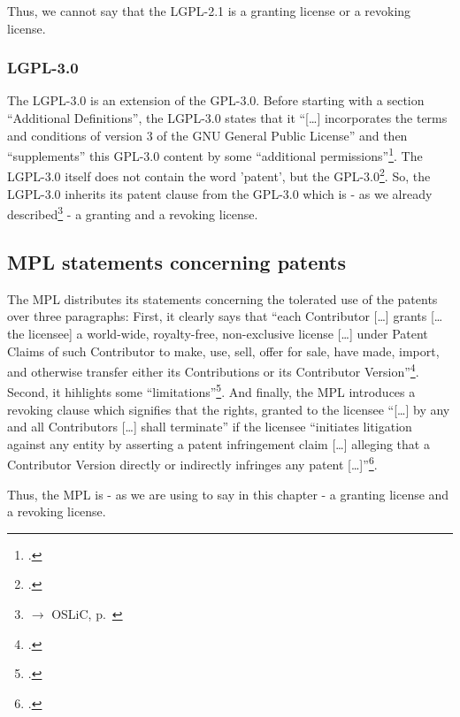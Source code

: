 Thus, we cannot say that the LGPL-2.1 is a granting license or a revoking
license.

\subsubsection {LGPL-3.0}\label{subsec:Lgpl30PatentClause}

The LGPL-3.0 is an extension of the GPL-3.0. Before starting with a section
\enquote{Additional Definitions}, the LGPL-3.0 states that it \enquote{[\ldots]
incorporates the terms and conditions of version 3 of the GNU General Public
License} and then \enquote{supplements} this GPL-3.0 content by some
\enquote{additional permissions}\footcite[cf.][\nopage
wp.]{Lgpl30OsiLicense2007a}. The LGPL-3.0 itself does not contain the word
'patent', but the GPL-3.0\footcite[cf.][\nopage wp.\ §11]{Gpl30OsiLicense2007a}.
So, the LGPL-3.0 inherits its patent clause from the GPL-3.0 which is - as we
already described\footnote{$\rightarrow$ OSLiC, p.\
\pageref{subsec:Gpl30PatentClause}} - a granting and a revoking license.
 
\subsection{MPL statements concerning patents}\label{subsec:MplPatentClause}

The MPL distributes its statements concerning the tolerated use of the patents
over three paragraphs: First, it clearly says that \enquote{each Contributor
[\ldots] grants [\ldots the licensee] a world-wide, royalty-free, non-exclusive
license [\ldots] under Patent Claims of such Contributor to make, use, sell,
offer for sale, have made, import, and otherwise transfer either its
Contributions or its Contributor Version}\footcite[cf.][\nopage wp.\ §2.1, esp.
§2.1.b]{Mpl20OsiLicense2013a}. Second, it hihlights some
\enquote{limitations}\footcite[cf.][\nopage wp.\ §2.1, esp.
§2.3]{Mpl20OsiLicense2013a}. And finally, the MPL introduces a revoking clause
which signifies that the rights, granted to the licensee \enquote{[\ldots] by
any and all Contributors [\ldots] shall terminate} if the licensee
\enquote{initiates litigation against any entity by asserting a patent
infringement claim [\ldots] alleging that a Contributor Version directly or
indirectly infringes any patent [\ldots]}\footcite[cf.][\nopage wp.\
§5.2]{Mpl20OsiLicense2013a}.

Thus, the MPL is - as we are using to say in this chapter - a granting license
and a revoking license.

